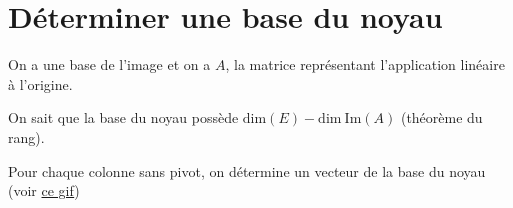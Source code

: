 \documentclass[a4paper, titlepage]{article}
\begin{document}
	\section{Déterminer une base du noyau}
	On a une base de l'image et on a $A$, la matrice représentant l'application linéaire à l'origine.

	On sait que la base du noyau possède $\mathrm{dim}(E)-\mathrm{dim}~\mathrm{Im}(A)$ (théorème du rang).
	
	Pour chaque colonne sans pivot, on détermine un vecteur de la base du noyau (voir \href{}{ce gif})
\end{document}
